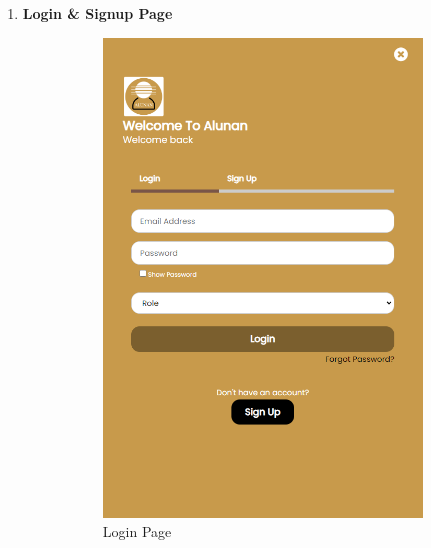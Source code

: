 \begin{enumerate}[1.]
    \item \textbf{Login \& Signup Page}
    \begin{figure}[h]
        \centering
        \begin{subfigure}[b]{0.4\textwidth}
            \centering
            \includegraphics[width=\textwidth]{mainmatter/images/frontend/ss/Login-Signup.png}
            \caption{Login Page}
            \label{fig:sub1}
        \end{subfigure}
        \hspace{0.05\textwidth}
        \begin{subfigure}[b]{0.4\textwidth}
            \centering

\end{subfigure}
\end{figure}
\end{enumerate}
